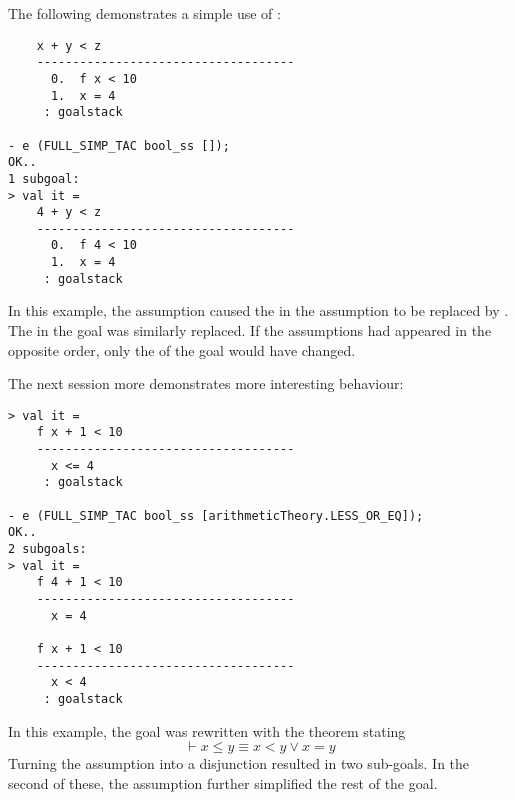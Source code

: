 {The following demonstrates a simple use of :
\begin{session}
\begin{hol}
\begin{verbatim}
    x + y < z
    ------------------------------------
      0.  f x < 10
      1.  x = 4
     : goalstack

- e (FULL_SIMP_TAC bool_ss []);
OK..
1 subgoal:
> val it =
    4 + y < z
    ------------------------------------
      0.  f 4 < 10
      1.  x = 4
     : goalstack
\end{verbatim}
\end{hol}
\end{session}
In this example, the assumption  caused the 
in the assumption  to be replaced by .  The
 in the goal was similarly replaced.  If the assumptions had
appeared in the opposite order, only the  of the goal would
have changed.

The next session more demonstrates more interesting behaviour:
\begin{session}
\begin{hol}
\begin{verbatim}
> val it =
    f x + 1 < 10
    ------------------------------------
      x <= 4
     : goalstack

- e (FULL_SIMP_TAC bool_ss [arithmeticTheory.LESS_OR_EQ]);
OK..
2 subgoals:
> val it =
    f 4 + 1 < 10
    ------------------------------------
      x = 4

    f x + 1 < 10
    ------------------------------------
      x < 4
     : goalstack
\end{verbatim}
\end{hol}
\end{session}
In this example, the goal was rewritten with the theorem stating
\[
\vdash x \leq y \equiv x < y \lor x = y
\]
Turning the assumption into a disjunction resulted in two sub-goals.
In the second of these, the assumption  further
simplified the rest of the goal.

\subsubsection{}

}
